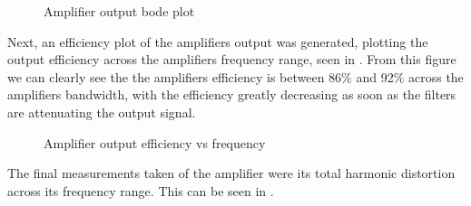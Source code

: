 \documentclass[a4paper,11pt]{article}
\begin{document}
\begin{figure}[H]
    \centering
    \caption{Amplifier output bode plot}
    \label{F:bode}
\end{figure}

Next, an efficiency plot of the amplifiers output was generated, plotting the output efficiency across the amplifiers frequency range, seen in . From this figure we can clearly see the the amplifiers efficiency is between 86\% and 92\% across the amplifiers bandwidth, with the efficiency greatly decreasing as soon as the filters are attenuating the output signal.

\begin{figure}[h!]
    \centering
    \caption{Amplifier output efficiency vs frequency}
    \label{F:efficiency}
\end{figure}

The final measurements taken of the amplifier were its total harmonic distortion across its frequency range. This can be seen in .
\end{document}
